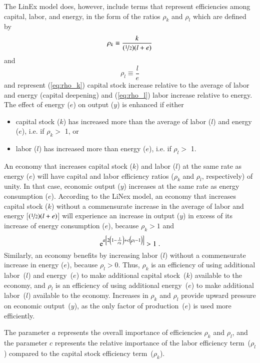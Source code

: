 \documentclass[preprint,authoryear,12pt]{elsarticle}
\begin{document}
The LinEx model does, however, include terms that represent
efficiencies among capital, labor, and energy, in the form of 
the ratios $\rho_k$ and $\rho_l$ which are defined by
%
\begin{equation} \label{eq:rho_k}
  \rho_k \equiv \frac{k}{(\nicefrac{1}{2})(l+e)}
\end{equation}
%
and
%
\begin{equation} \label{eq:rho_l}
  \rho_l \equiv \frac{l}{e}
\end{equation}
%
and represent 
%
(\ref{eq:rho_k}) capital stock increase relative to the average of labor and energy (capital deepening) and 
(\ref{eq:rho_l}) labor increase relative to energy.
The effect of energy ($e$) on output ($y$) is enhanced if either
%
\begin{itemize}
\item{capital stock ($k$) has increased more than the average 
      of labor ($l$) and energy ($e$), i.e. if $\rho_k >$ 1, or}
\item{labor ($l$) has increased more than energy ($e$), i.e. if $\rho_l >$ 1.}
\end{itemize}
%
An economy that increases 
capital stock ($k$) and labor ($l$) at the same rate as energy ($e$) will have
capital and labor efficiency ratios ($\rho_k$ and $\rho_l$, respectively) of unity.
In that case, economic output ($y$) increases at the same rate as energy consumption ($e$).
According to the LiNex model, an economy that increases 
capital stock ($k$) without a commensurate increase in the average of labor
and energy [$(\nicefrac{1}{2})(l+e)$] will experience an increase in output ($y$) in excess 
of its increase of energy consumption ($e$), because $\rho_k > 1$ and
%
\begin{equation}
    \mathrm{e}^{a \left[2 \left(1 - \frac{1}{\rho_k} \right) 
    + c \left(\vphantom{\frac{1}{\rho_k}}\rho_l - 1 \right)\right]}
	> 1 \; .
\end{equation}
%
Similarly, an economy benefits by increasing labor ($l$) 
without a commensurate increase in energy ($e$), because $\rho_l > 0$. 
Thus, $\rho_k$ is an 
efficiency of using additional labor~($l$) and energy~($e$) to make 
additional capital stock~($k$) available to the economy, 
and $\rho_l$ is an efficiency of using additional energy~($e$) to make 
additional labor~($l$) available to the economy. 
Increases in $\rho_k$ and $\rho_l$ provide upward pressure on economic output~($y$),
as the only factor of production~($e$) is used more efficiently.

The parameter $a$ represents the overall importance of efficiencies $\rho_k$ and $\rho_l$, 
and the parameter $c$ represents the relative importance 
of the labor efficiency term~($\rho_l$) compared to the capital stock efficiency term~($\rho_k$). 
\end{document}
